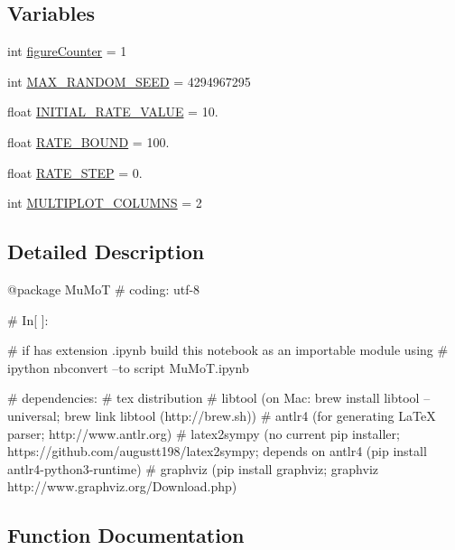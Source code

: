 \subsection*{Variables}
\begin{DoxyCompactItemize}
\item 
int \hyperlink{namespace_mu_mo_t_a4543afee285a2aa1cd5c8c9ca14fe77f}{figure\+Counter} = 1
\item 
int \hyperlink{namespace_mu_mo_t_ae8957aab30c8ae3e6065cd19d166ef22}{M\+A\+X\+\_\+\+R\+A\+N\+D\+O\+M\+\_\+\+S\+E\+ED} = 4294967295
\item 
float \hyperlink{namespace_mu_mo_t_aa168c4a595cabfd7f2af95bcc8c8636f}{I\+N\+I\+T\+I\+A\+L\+\_\+\+R\+A\+T\+E\+\_\+\+V\+A\+L\+UE} = 10.
\item 
float \hyperlink{namespace_mu_mo_t_ad02e9bfc63846779b7b8c5aff0688879}{R\+A\+T\+E\+\_\+\+B\+O\+U\+ND} = 100.
\item 
float \hyperlink{namespace_mu_mo_t_a62b44f6ef63c58313e64af86a7219285}{R\+A\+T\+E\+\_\+\+S\+T\+EP} = 0.
\item 
int \hyperlink{namespace_mu_mo_t_a3911ed84a3973ff4c37bb3bd7d39f22d}{M\+U\+L\+T\+I\+P\+L\+O\+T\+\_\+\+C\+O\+L\+U\+M\+NS} = 2
\end{DoxyCompactItemize}


\subsection{Detailed Description}
\begin{DoxyVerb}@package MuMoT
# coding: utf-8

# In[ ]:

# if has extension .ipynb build this notebook as an importable module using
# ipython nbconvert --to script MuMoT.ipynb

# dependencies:
#  tex distribution
#  libtool (on Mac: brew install libtool --universal; brew link libtool (http://brew.sh))
#  antlr4 (for generating LaTeX parser; http://www.antlr.org)
#  latex2sympy (no current pip installer; https://github.com/augustt198/latex2sympy; depends on antlr4 (pip install antlr4-python3-runtime)
#  graphviz (pip install graphviz; graphviz http://www.graphviz.org/Download.php)
\end{DoxyVerb}
 

\subsection{Function Documentation}
\mbox{\label{namespace_mu_mo_t_a4cf5ca1427b0999c933587bfaa89936d}} 
